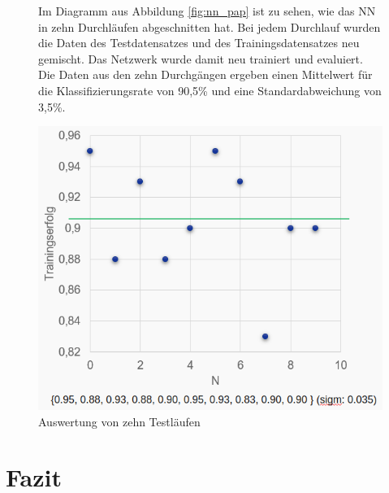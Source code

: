 \documentclass[12pt,toc=bib,toc=listof]{scrreprt}
\begin{document}
\begin{figure}[h]
\begin{minipage}[t]{.48\linewidth}

Im Diagramm aus Abbildung \ref{fig:nn_pap} ist zu sehen, wie das NN in zehn Durchläufen abgeschnitten hat. Bei jedem Durchlauf wurden die Daten des Testdatensatzes und des Trainingsdatensatzes neu gemischt. Das Netzwerk wurde damit neu trainiert und evaluiert. Die Daten aus den zehn Durchgängen ergeben einen Mittelwert für die Klassifizierungsrate von 90,5\% und eine Standardabweichung von 3,5\%.  
\end{minipage}
\hfill
\begin{minipage}[t]{.47\linewidth}
\strut\vspace*{-\baselineskip}
\newline
  \includegraphics[width=\linewidth]{./bilder/auswertung}
  \caption{Auswertung von zehn Testläufen}
  \label{fig:nn_ausw}
\end{minipage}
\end{figure}

\chapter{Fazit} %
\label{sec:fazit}
\end{document}
